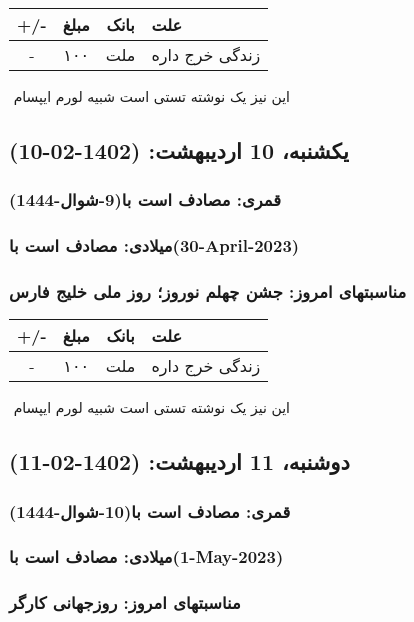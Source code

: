 \documentclass{article}
\newcommand{\rnote}[1]{\marginpar{\textcolor{color}{\StrSubstitute{\##1}{ }{\_}}}}
\newcommand{\myRow}[4]{
    #1 & #2 & #3 & #4 \\ \hline
}
\begin{document}
\begin{tabular}{ | c | c | c | p{5cm} |}
    \hline
    \myRow{ +/- }{مبلغ}{بانک}{علت}
    \myRow{-}{۱۰۰}{ملت}{زندگی خرج داره}
\end{tabular}
\newline
\newline

‌
\rnote{تست}
این نیز یک نوشته تستی است شبیه لورم ایپسام




\newpage
{}
\textcolor{color}{
\section{ یکشنبه، 10 اردیبهشت: (1402-02-10) }
\subsubsection*{قمری: مصادف است با(9-شوال-1444)} 
\subsubsection*{میلادی: مصادف است با(30-April-2023)}
\subsubsection*{مناسبتهای امروز: جشن چهلم نوروز؛ روز ملی خلیج فارس}
}


\begin{tabular}{ | c | c | c | p{5cm} |}
    \hline
    \myRow{ +/- }{مبلغ}{بانک}{علت}
    \myRow{-}{۱۰۰}{ملت}{زندگی خرج داره}
\end{tabular}
\newline
\newline

‌
\rnote{تست}
این نیز یک نوشته تستی است شبیه لورم ایپسام




\newpage
{}
\textcolor{color}{
\section{ دوشنبه، 11 اردیبهشت: (1402-02-11) }
\subsubsection*{قمری: مصادف است با(10-شوال-1444)} 
\subsubsection*{میلادی: مصادف است با(1-May-2023)}
\subsubsection*{مناسبتهای امروز: روزجهانی کارگر}
}
\end{document}
